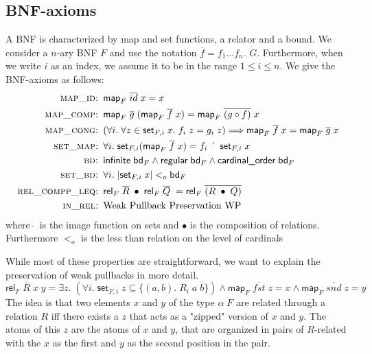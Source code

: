     \subsection{BNF-axioms}
      A \ac{BNF} is characterized by map and set functions, a relator and a bound. We consider a $n$-ary \ac{BNF} $F$ and use the notation $\overline{f} = f_1 \dots f_n$. $\dot{G}$. Furthermore, when we write $i$ as an index, we assume it to be in the range $1 \leq i \leq n$.
      We give the \ac{BNF}-axioms as follows:
      \begin{align}
        \textsc{map\_id: }& \textsf{map}_F\; \overline{id}\; x = x\\
        \textsc{map\_comp: }& \textsf{map}_F\; \overline{g}\; (\textsf{map}_F\; \overline{f}\; x) = \textsf{map}_F\; \overline{(g \circ f)}\; x\\
        \textsc{map\_cong: }& (\forall i.\; \forall z \in \textsf{set}_{F,i}\; x.\; f_i\; z = g_i\; z) \Longrightarrow 
          \textsf{map}_F\; \overline{f}\; x = \textsf{map}_F\; \overline{g}\; x\\
        \textsc{set\_map: }& \forall i.\; \textsf{set}_{F,i} (\textsf{map}_F\; \overline{f}\; x) = f_i\; \grave{\phantom{\_}}\; \textsf{set}_{F,i}\; x\\
        \textsc{bd: }& \textsf{infinite}\; \textsf{bd}_F \land 
          \textsf{regular}\; \textsf{bd}_F \land 
          \textsf{cardinal\_order}\; \textsf{bd}_F\\
        \textsc{set\_bd: }& \forall i.\; | \textsf{set}_{F,i}\; x | <_o \textsf{bd}_F\\
        \textsc{rel\_compp\_leq: }& \textsf{rel}_F\; \overline{R}\; \bullet\; \textsf{rel}_F\; \overline{Q}\; = 
          \textsf{rel}_F\; \overline{(R\; \bullet\; Q)}\\
        \textsc{in\_rel: }& \text{Weak Pullback Preservation WP}
      \end{align}
      \noindent where $\grave{\phantom{\_}}$ is the image function on sets and $\bullet$ is the composition of relations. Furthermore $<_o$ is the less than relation on the level of cardinals

      While most of these properties are straightforward, we want to explain the preservation of weak pullbacks in more detail.
      \begin{equation}
        \textsf{rel}_F\; \overline{R}\; x\; y = 
          \exists z.\; (\forall i.\; \textsf{set}_{F,i}\; z \subseteq \{(a, b).\; R_i\; a\; b \}) \land 
          \textsf{map}_F\; \overline{fst}\; z = x \land \textsf{map}_F\; \overline{snd}\; z = y \label{eq:WP}
      \end{equation}
      The idea is that two elements $x$ and $y$ of the type $\alpha\; F$ are related through a relation $R$ iff there exists a $z$ that acts as a "zipped" version of $x$ and $y$. The atoms of this $z$ are the atoms of $x$ and $y$, that are organized in pairs of $R$-related with the $x$ as the first and $y$ as the second position in the pair.

